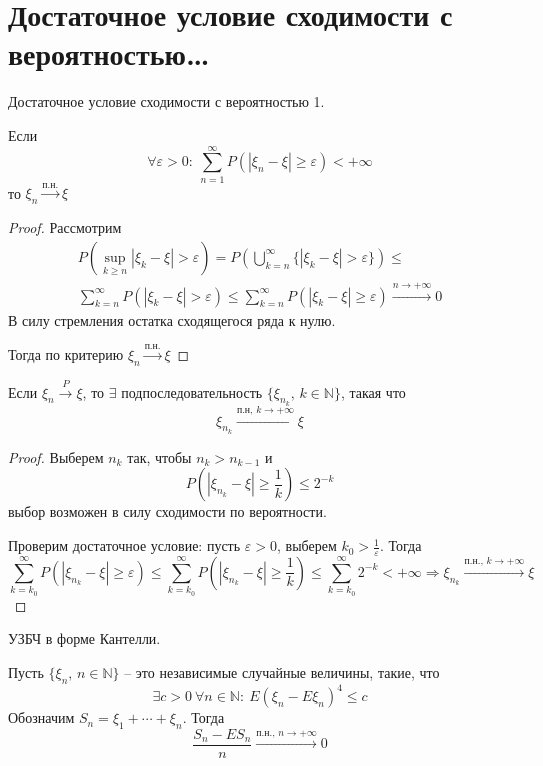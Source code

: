 \section{Достаточное условие сходимости с вероятностью\dots}
\begin{lemma}
  Достаточное условие сходимости с вероятностью 1.

  Если 
  \[\forall \varepsilon > 0:\: \sum_{n = 1}^\infty P(|\xi_n - \xi| \geq \varepsilon) < +\infty\]
  то $\xi_n \stackrel{\text{п.н.}}{\to} \xi$
\end{lemma}

\begin{proof}
  Рассмотрим
  \begin{align*}
    P(\sup_{k \geq n}|\xi_k - \xi| > \varepsilon) = P\left(\bigcup_{k = n}^\infty \{|\xi_k - \xi| > \varepsilon\}\right) \leq\\
    \sum_{k = n}^\infty P(|\xi_k - \xi| > \varepsilon) \leq \sum_{k = n}^\infty P(|\xi_k - \xi| \geq \varepsilon) \stackrel{n \to +\infty}{\to} 0
  \end{align*}
  В силу стремления остатка сходящегося ряда к нулю.

  Тогда по критерию $\xi_n \stackrel{\text{п.н.}}{\to} \xi$
\end{proof}

\begin{corollary}
  Если $\xi_n \stackrel{P}{\to} \xi$, то $\exists$ подпоследовательность $\{\xi_{n_k},\, k \in \mathbb{N}\}$, такая что
  \[\xi_{n_k} \stackrel{\text{п.н},\, k \to +\infty}{\to} \xi\]
\end{corollary}

\begin{proof}
  Выберем $n_k$ так, чтобы $n_k > n_{k - 1}$ и 
  \[P(|\xi_{n_k} - \xi| \geq \frac{1}{k}) \leq 2^{-k}\]
  выбор возможен в силу сходимости по вероятности.

  Проверим достаточное условие: пусть $\varepsilon > 0$, выберем $k_0 > \frac{1}{\varepsilon}$. Тогда
  \[
    \sum_{k = k_0}^\infty P(|\xi_{n_k} - \xi| \geq \varepsilon) \leq \sum_{k = k_0}^\infty P(|\xi_{n_k} - \xi| \geq \frac{1}{k}) \leq \sum_{k = k_0}^\infty 2^{-k} < +\infty \Rightarrow \xi_{n_k} \stackrel{\text{п.н.},\, k \to +\infty}{\to} \xi
  \]
\end{proof}

\begin{theorem}
  УЗБЧ в форме Кантелли.

  Пусть $\{\xi_n,\, n \in \mathbb{N}\}$ -- это независимые случайные величины, такие, что
  \[\exists c > 0 \: \forall n \in \mathbb{N}:\: E(\xi_n - E\xi_n)^4 \leq c\]
  Обозначим $S_n = \xi_1 + \cdots + \xi_n$. Тогда
  \[\frac{S_n - ES_n}{n} \stackrel{\text{п.н.},\, n \to +\infty}{\to} 0\]
\end{theorem}


